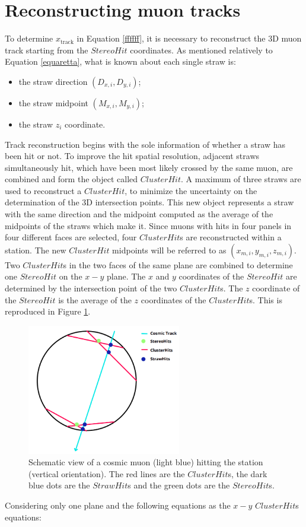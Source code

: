 \section{Reconstructing muon tracks}\label{reconstruction}
To determine $x_{\text{track}}$ in Equation \ref{ffffff}, 
it is necessary to reconstruct the 3D muon track 
starting from the $StereoHit$ coordinates.
As mentioned relatively to Equation \ref{equaretta}, 
what is known about each single straw is:
\begin{itemize}
    \item the straw direction $(D_{x,i},D_{y,i})$;
    \item the straw midpoint $(M_{x,i},M_{y,i})$;
    \item the straw $z_i$ coordinate.
\end{itemize} 
Track reconstruction begins 
with the sole information of whether 
a straw has been hit or not.
To improve the hit spatial resolution, adjacent 
straws simultaneously hit, which have been most 
likely crossed by the same muon, are combined 
and form the object called $ClusterHit$. 
A maximum of three straws are used to reconstruct a 
$ClusterHit$, to minimize the uncertainty on 
the determination of the 3D intersection points.
This new object represents a 
straw with the same direction and the midpoint 
computed as the average of the midpoints of the straws  
which make it. Since muons with hits in four panels in four different 
faces are selected, four $ClusterHit$s are reconstructed 
within a station. The new $ClusterHit$ 
midpoints will be referred to as 
$(x_{m,i}, y_{m,i}, z_{m,i})$.
Two $ClusterHit$s in the two faces of the same 
plane are combined to determine one $StereoHit$ on 
the $x-y$ plane. 
The $x$ and $y$ coordinates of the 
$StereoHit$ are determined by the 
intersection point of the two 
$ClusterHit$s. The $z$ coordinate of 
the $StereoHit$ is the average of the 
$z$ coordinates of the $ClusterHit$s.
This is reproduced in Figure \ref{fig:stco}.
\begin{figure}[!h]
    \centering
    \includegraphics[width =0.6\textwidth]{figures/png/Screenshot_20240810_210144.png}
    \caption[Schematic view of a cosmic muon hitting the vertical 
    oriented station.]{Schematic 
    view of a cosmic muon (light blue) hitting the station 
    (vertical orientation). The red lines are the $ClusterHit$s, 
    the dark blue dots 
    are the $StrawHit$s and the green dots are the $StereoHit$s.}
    \label{fig:stco}
\end{figure}
Considering only one plane and the following 
equations as the $x-y$ $ClusterHit$s equations:

